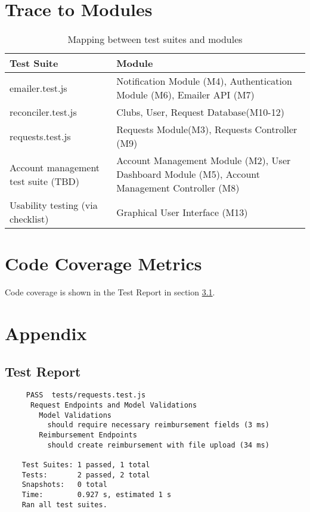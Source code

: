 \documentclass[12pt, titlepage]{article}
\begin{document}
\section{Trace to Modules}
\begin{table}[H]
\begin{tabularx}{\textwidth}{p{5cm}p{5cm}}
\toprule {\bf Test Suite} & {\bf Module}\\
\midrule 
emailer.test.js & Notification Module (M4), Authentication Module (M6), Emailer API (M7)\\
reconciler.test.js & Clubs, User, Request Database(M10-12)\\
requests.test.js & Requests Module(M3), Requests Controller (M9)\\
Account management test suite (TBD) & Account Management Module (M2), User Dashboard Module (M5), Account Management Controller (M8)\\
Usability testing (via checklist) & Graphical User Interface (M13)\\
\bottomrule
\end{tabularx}
\caption{Mapping between test suites and modules}
\end{table}

\newpage

\section{Code Coverage Metrics}

Code coverage is shown in the Test Report in section \ref{test_report}.

\section{Appendix}
\subsection{Test Report} \label{test_report}
\begin{small} 
  \begin{verbatim} 
     PASS  tests/requests.test.js
      Request Endpoints and Model Validations
        Model Validations
          should require necessary reimbursement fields (3 ms)
        Reimbursement Endpoints
          should create reimbursement with file upload (34 ms)

    Test Suites: 1 passed, 1 total
    Tests:       2 passed, 2 total
    Snapshots:   0 total
    Time:        0.927 s, estimated 1 s
    Ran all test suites.
  \end{verbatim}
\end{small}
\end{document}
